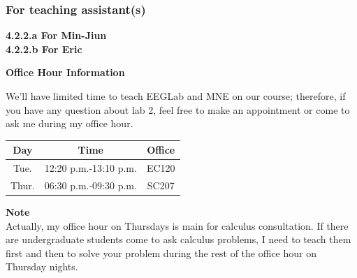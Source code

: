 \documentclass[a4 paper]{article}
\begin{document}
\subsubsection{For teaching assistant(s)}
\textbf{4.2.2.a For Min-Jiun}\\
\textbf{4.2.2.b For Eric}\\
\noindent{\color{LightRubineRed} \rule{\linewidth}{0.5mm}}
\begin{center}
    \large{\textbf{Office Hour Information}}
\end{center}
\par We'll have limited time to teach EEGLab and MNE on our course; therefore, if you have any question about lab 2, feel free to make an appointment or come to ask me during my office hour.\\
\begin{center}
    \begin{tabular}{||c|c|c||}
    \hline
    Day & Time & Office\\
        \hline\hline
          Tue. & 12:20 p.m.-13:10 p.m. & EC120 \\
          \hline
          Thur. & 06:30 p.m.-09:30 p.m. & SC207\\
          \hline
    \end{tabular}
\end{center}
\textbf{Note}\\
Actually, my office hour on Thursdays is main for calculus consultation. If there are undergraduate students come to ask calculus problems, I need to teach them first and then to solve your problem during the rest of the office hour on Thursday nights.\\
\noindent{\color{LightRubineRed} \rule{\linewidth}{0.5mm}}
\end{document}

